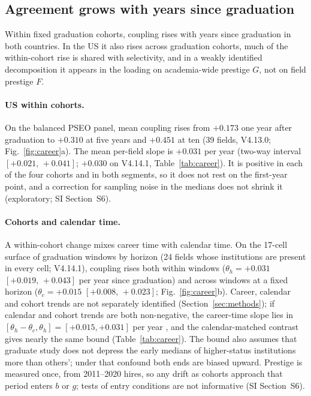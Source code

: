 \documentclass[11pt]{article}
\newcommand{\SI}[1]{SI Section~S#1}
\newcommand{\ci}[2]{$[#1,\allowbreak\,#2]$}
\begin{document}
\subsection{Agreement grows with years since graduation}\label{sec:career}

Within fixed graduation cohorts, coupling rises with years since graduation in both countries. In the US it also
rises across graduation cohorts, much of the within-cohort rise is shared with selectivity, and in a weakly
identified decomposition it appears in the loading on academia-wide prestige $G$, not on field prestige $F$.

\paragraph{US within cohorts.} On the balanced PSEO panel, mean coupling rises from $+0.173$ one year after
graduation to $+0.310$ at five years and $+0.451$ at ten (39 fields, V4.13.0; Fig.~\ref{fig:career}a). The mean
per-field slope is $+0.031$ per year (two-way interval \ci{+0.021}{+0.041}; $+0.030$ on V4.14.1,
Table~\ref{tab:career}). It is positive in each of the four cohorts and in both segments, so it does not rest on the first-year point,
and a correction for sampling noise in the medians does not shrink it (exploratory; \SI{6}).

\paragraph{Cohorts and calendar time.} A within-cohort change mixes career time with calendar time. On the 17-cell
surface of graduation windows by horizon (24 fields whose institutions are present in every cell; V4.14.1),
coupling rises both within windows ($\theta_h=+0.031$ \ci{+0.019}{+0.043} per year since graduation) and across
windows at a fixed horizon ($\theta_c=+0.015$ \ci{+0.008}{+0.023}; Fig.~\ref{fig:career}b). Career, calendar and cohort trends are not separately identified (Section~\ref{sec:methods}); if calendar and
cohort trends are both non-negative, the career-time slope lies in $[\theta_h-\theta_c,\theta_h]=[+0.015,+0.031]$
per year \citep{fosse2019bounding}, and the calendar-matched contrast gives nearly the same bound
(Table~\ref{tab:career}). The bound also assumes that graduate study does not depress the early medians of
higher-status institutions more than others'; under that confound both ends are biased upward. Prestige is measured once, from 2011--2020 hires, so any drift as cohorts approach that period enters $b$ or $g$;
tests of entry conditions \citep[cf.][]{oreopoulos2012short} are not informative (\SI{6}).
\end{document}
